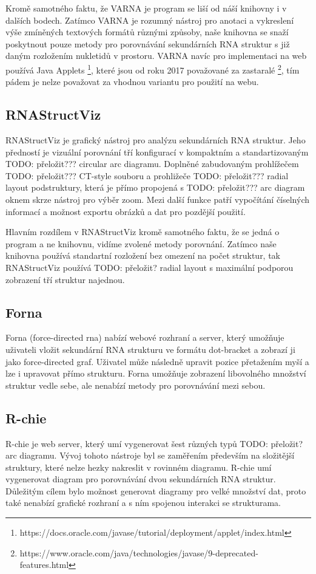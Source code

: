   Kromě samotného faktu, že VARNA je program se liší od náší knihovny i v
  dalších bodech. Zatímco VARNA je rozumný nástroj pro anotaci a vykreslení
  výše zmíněných textových formátů různými způsoby, naše knihovna se snaží
  poskytnout pouze metody pro porovnávání sekundárních RNA struktur s již daným
  rozložením nukletidů v prostoru. VARNA navíc pro implementaci na web používá
  Java Applets
  \footnote{https://docs.oracle.com/javase/tutorial/deployment/applet/index.html},
  které jsou od roku 2017 považované za zastaralé
  \footnote{https://www.oracle.com/java/technologies/javase/9-deprecated-features.html},
  tím pádem je nelze považovat za vhodnou variantu pro použití na webu.

\subsection{RNAStructViz}
  RNAStructViz\cite{RnaStructViz} je grafický nástroj pro analýzu sekundárních
  RNA struktur. Jeho předností je vizuální porovnání tří konfigurací v
  kompaktním a standartizovaným {\color{red} TODO: přeložit???} circular arc
  diagramu. Doplněné zabudovaným prohlížečem {\color{red} TODO: přeložit???}
  CT-style souboru a prohližeče {\color{red} TODO: přeložit???} radial layout
  podstruktury, která je přímo propojená s {\color{red} TODO: přeložit???} arc
  diagram oknem skrze nástroj pro výběr zoom. Mezi další funkce patří
  vypočítání číselných informací a možnost exportu obrázků a dat pro pozdější
  použití.

  Hlavním rozdílem v RNAStructViz kromě samotného faktu, že se
  jedná o program a ne knihovnu, vidíme zvolené metody porovnání.
  Zatímco naše knihovna používá standartní rozložení bez omezení
  na počet struktur, tak RNAStructViz používá {\color{red} TODO:
  přeložit?} radial layout s maximální podporou zobrazení tří
  struktur najednou.

\subsection{Forna}
  Forna\cite{Forna} (force-directed rna) nabízí webové rozhraní a server, který
  umožňuje uživateli vložit sekundární RNA strukturu ve formátu dot-bracket a
  zobrazí ji jako force-directed graf. Uživatel může následně upravit pozice
  přetažením myší a lze i upravovat přímo strukturu. Forna umožňuje zobrazení
  libovolného množství struktur vedle sebe, ale nenabízí metody pro porovnávání
  mezi sebou.

\subsection{R-chie}
  R-chie \cite{Rchie} je web server, který umí vygenerovat šest různých typů
  {\color{red} TODO: přeložit?} arc diagramu. Vývoj tohoto nástroje byl se
  zaměřením především na složitější struktury, které nelze hezky nakreslit v
  rovinném diagramu. R-chie umí vygenerovat diagram pro porovnávání dvou
  sekundárních RNA struktur. Důležitým cílem bylo možnost generovat diagramy
  pro velké množství dat, proto také nenabízí grafické rozhraní a s ním
  spojenou interakci se strukturama. 

